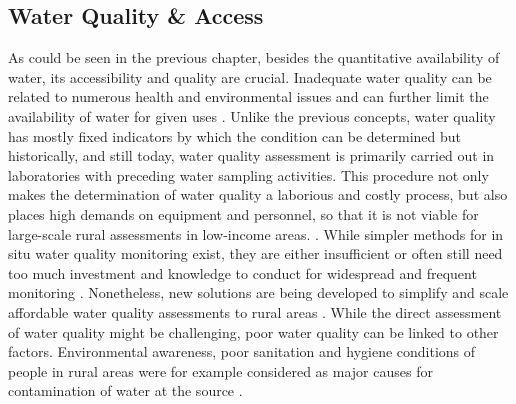 
\subsection{Water Quality \& Access}

As could be seen in the previous chapter, besides the quantitative availability of water, its accessibility and quality are crucial. Inadequate water quality can be related to numerous health and environmental issues and can further limit the availability of water for given uses \autocite{rcrcFORECASTBASEDFINANCINGEARLY2020, faoCopingWaterScarcity2012}. Unlike the previous concepts, water quality has mostly fixed indicators by which the condition can be determined but historically, and still today, water quality assessment is primarily carried out in laboratories with preceding water sampling activities. This procedure not only makes the determination of water quality a laborious and costly process, but also places high demands on equipment and personnel, so that it is not viable for large-scale rural assessments in low-income areas. \autocite{tariqOpenSourceWater2021,worldmeteorologicalorganizationPlanningWaterqualityMonitoring2013}. While simpler methods for in situ water quality monitoring exist, they are either insufficient or often still need too much investment and knowledge to conduct for widespread and frequent monitoring \autocite{worldmeteorologicalorganizationPlanningWaterqualityMonitoring2013}. Nonetheless, new solutions are being developed to simplify and scale affordable water quality assessments to rural areas \autocite{ighaloComprehensiveReviewWater2020,tariqOpenSourceWater2021}. While the direct assessment of water quality might be challenging, poor water quality can be linked to other factors. Environmental awareness, poor sanitation and hygiene conditions of people in rural areas were for example considered as major causes for contamination of water at the source \autocite{zamxakaMicrobiologicalPhysicochemicalAssessment2004}.

